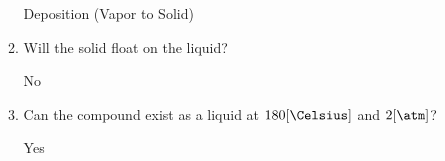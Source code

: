 \documentclass[12pt]{article}
\begin{document}
\begin{enumerate}
\begin{enumerate}
        \begin{center}

          Deposition (Vapor to Solid) 
          
        \end{center}

      \item Will the solid float on the liquid?

        \begin{center}

          No
          
        \end{center}

      \item Can the compound exist as a liquid at $180[\si{\Celsius}]$ and $2[\si{\atm}]$?

        \begin{center}

          Yes
          
        \end{center}


    \end{enumerate}

\end{enumerate}
\end{document}
